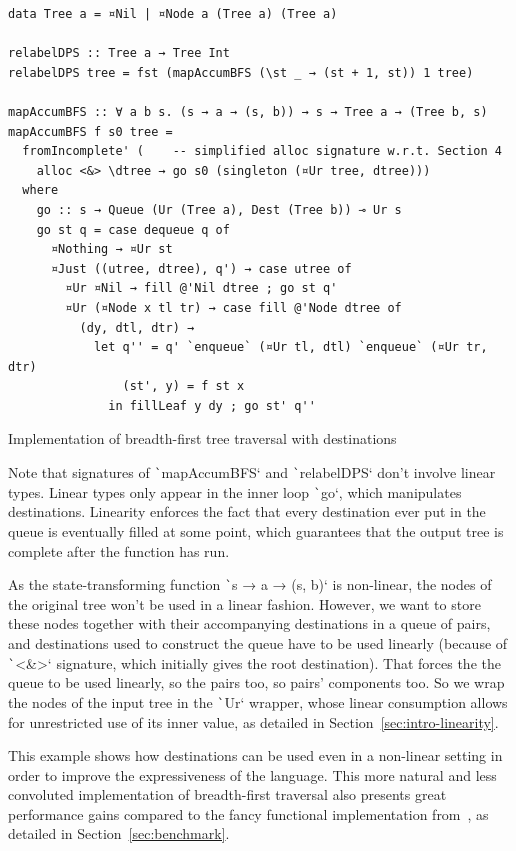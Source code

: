 \documentclass[english]{jflart}
\begin{document}
\begin{table}[t]
\small
\begin{verbatim}
data Tree a = ¤Nil | ¤Node a (Tree a) (Tree a)

relabelDPS :: Tree a → Tree Int
relabelDPS tree = fst (mapAccumBFS (\st _ → (st + 1, st)) 1 tree)

mapAccumBFS :: ∀ a b s. (s → a → (s, b)) → s → Tree a → (Tree b, s)
mapAccumBFS f s0 tree =
  fromIncomplete' (    -- simplified alloc signature w.r.t. Section 4
    alloc <&> \dtree → go s0 (singleton (¤Ur tree, dtree)))
  where
    go :: s → Queue (Ur (Tree a), Dest (Tree b)) ⊸ Ur s
    go st q = case dequeue q of
      ¤Nothing → ¤Ur st
      ¤Just ((utree, dtree), q') → case utree of
        ¤Ur ¤Nil → fill @'Nil dtree ; go st q'
        ¤Ur (¤Node x tl tr) → case fill @'Node dtree of
          (dy, dtl, dtr) →
            let q'' = q' `enqueue` (¤Ur tl, dtl) `enqueue` (¤Ur tr, dtr)
                (st', y) = f st x
              in fillLeaf y dy ; go st' q''
\end{verbatim}
\caption{Implementation of breadth-first tree traversal with destinations}
\label{table:impl-bfs-tree-traversal}
\end{table}

Note that signatures of \texttt`mapAccumBFS` and \texttt`relabelDPS` don't involve linear types. Linear types only appear in the inner loop \texttt`go`, which manipulates destinations. Linearity enforces the fact that every destination ever put in the queue is eventually filled at some point, which guarantees that the output tree is complete after the function has run.

As the state-transforming function \texttt`s → a → (s, b)` is non-linear, the nodes of the original tree won't be used in a linear fashion. However, we want to store these nodes together with their accompanying destinations in a queue of pairs, and destinations used to construct the queue have to be used linearly (because of \texttt`<&>` signature, which initially gives the root destination). That forces the the queue to be used linearly, so the pairs too, so pairs' components too. So we wrap the nodes of the input tree in the \texttt`Ur` wrapper, whose linear consumption allows for unrestricted use of its inner value, as detailed in Section~\ref{sec:intro-linearity}.

This example shows how destinations can be used even in a non-linear setting in order to improve the expressiveness of the language. This more natural and less convoluted implementation of breadth-first traversal also presents great performance gains compared to the fancy functional implementation from~\cite{gibbons_phases_2023}, as detailed in Section~\ref{sec:benchmark}.
\end{document}
